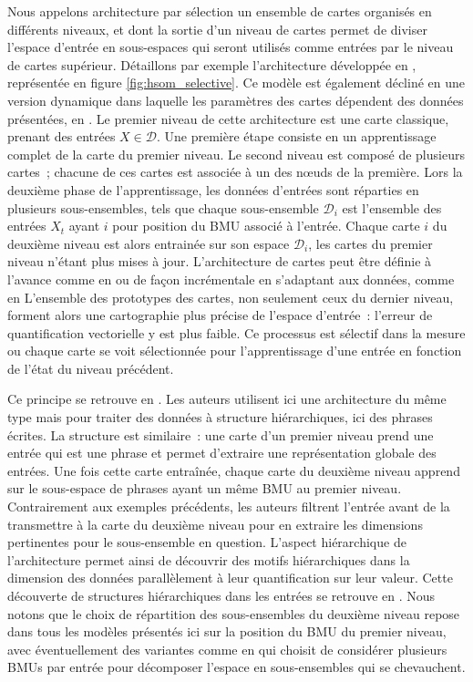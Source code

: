 \documentclass[../main]{subfiles}
\begin{document}
Nous appelons architecture par sélection un ensemble de cartes organisés en différents niveaux, et dont la sortie d'un niveau de cartes permet de diviser l'espace d'entrée en sous-espaces qui seront utilisés comme entrées par le niveau de cartes supérieur.
Détaillons par exemple l'architecture développée en \cite{barbalho_hierarchical_2001}, représentée en figure \ref{fig:hsom_selective}. Ce modèle est également décliné en une version dynamique dans laquelle les paramètres des cartes dépendent des données présentées, en \cite{Costa2016ANS}.
Le premier niveau de cette architecture est une carte classique, prenant des entrées $X \in \mathcal{D}$.
Une première étape consiste en un apprentissage complet de la carte du premier niveau.
Le second niveau est composé de plusieurs cartes~; chacune de ces cartes est associée à un des n\oe{}uds de la première.
Lors la deuxième phase de l'apprentissage, les données d'entrées sont réparties en plusieurs sous-ensembles, tels que chaque sous-ensemble $\mathcal{D}_i$ est l'ensemble des entrées $X_t$ ayant $i$ pour position du BMU associé à l'entrée.
Chaque carte $i$ du deuxième niveau est alors entrainée sur son espace $\mathcal{D}_i$, les cartes du premier niveau n'étant plus mises à jour.
L'architecture de cartes peut être définie à l'avance comme en \cite{barbalho_hierarchical_2001} ou de façon incrémentale en s'adaptant aux données, comme en \cite{Costa2016ANS} 
L'ensemble des prototypes des cartes, non seulement ceux du dernier niveau, forment alors une cartographie plus précise de l'espace d'entrée~: l'erreur de quantification vectorielle y est plus faible.
Ce processus est sélectif dans la mesure ou chaque carte se voit sélectionnée pour l'apprentissage d'une entrée en fonction de l'état du niveau précédent.

Ce principe se retrouve en \cite{miikkulainen_script_1992}. 
Les auteurs utilisent ici une architecture du même type mais pour traiter des données à structure hiérarchiques, ici des phrases écrites. La structure est similaire~: une carte d'un premier niveau prend une entrée qui est une phrase et permet d'extraire une représentation globale des entrées. Une fois cette carte entraînée, chaque carte du deuxième niveau apprend sur le sous-espace de phrases ayant un même BMU au premier niveau. Contrairement aux exemples précédents, les auteurs filtrent l'entrée avant de la transmettre à la carte du deuxième niveau pour en extraire les dimensions pertinentes pour le sous-ensemble en question. L'aspect hiérarchique de l'architecture permet ainsi de découvrir des motifs hiérarchiques dans la dimension des données parallèlement à leur quantification sur leur valeur.
Cette découverte de structures hiérarchiques dans les entrées se retrouve en \cite{ordonez_hierarchical_2010,dittenbach_growing_2000}.
Nous notons que le choix de répartition des sous-ensembles du deuxième niveau repose dans tous les modèles présentés ici sur la position du BMU du premier niveau, avec éventuellement des variantes comme en \cite{suganthan_pattern_2001} qui choisit de considérer plusieurs BMUs par entrée pour décomposer l'espace en sous-ensembles qui se chevauchent.
\end{document}
